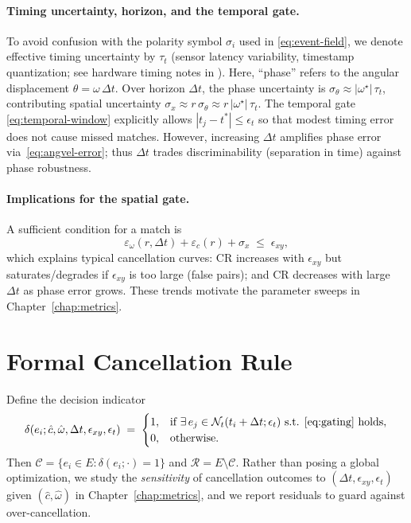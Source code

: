 \paragraph{Timing uncertainty, horizon, and the temporal gate.}
To avoid confusion with the polarity symbol $\sigma_i$ used in \eqref{eq:event-field}, we denote effective timing uncertainty by $\tau_t$ (sensor latency variability, timestamp quantization; see hardware timing notes in \cite{Lichtsteiner2008DVS,Delbruck2014ISCAS}). Here, ``phase'' refers to the angular displacement $\theta=\omega\,\Delta t$. Over horizon $\Delta t$, the phase uncertainty is $\sigma_\theta \approx |\omega^\star|\,\tau_t$, contributing spatial uncertainty $\sigma_x \approx r\,\sigma_\theta \approx r\,|\omega^\star|\,\tau_t$. The temporal gate \eqref{eq:temporal-window} explicitly allows $|t_j-t^*|\le \epsilon_t$ so that modest timing error does not cause missed matches. However, increasing $\Delta t$ amplifies phase error via~\eqref{eq:angvel-error}; thus $\Delta t$ trades discriminability (separation in time) against phase robustness.

\paragraph{Implications for the spatial gate.}
A sufficient condition for a match is
\begin{equation}
\varepsilon_{\omega}(r,\Delta t) + \varepsilon_c(r) + \sigma_x \;\le\; \epsilon_{xy},
\label{eq:gate-condition}
\end{equation}
which explains typical cancellation curves: $\mathrm{CR}$ increases with $\epsilon_{xy}$ but saturates/degrades if $\epsilon_{xy}$ is too large (false pairs); and $\mathrm{CR}$ decreases with large $\Delta t$ as phase error grows. These trends motivate the parameter sweeps in Chapter~\ref{chap:metrics}.

\section{Formal Cancellation Rule}
Define the decision indicator
\begin{equation}
\delta(e_i; \hat c,\hat\omega,\Delta t,\epsilon_{xy},\epsilon_t) \;=\;
\begin{cases}
1, & \text{if } \exists\, e_j \in \mathcal{N}_t(t_i+\Delta t;\epsilon_t) \text{ s.t. } \eqref{eq:gating}\text{ holds},\\
0, & \text{otherwise.}
\end{cases}
\label{eq:delta-indicator}
\end{equation}
Then $\mathcal{C}=\{e_i\in E:\delta(e_i;\cdot)=1\}$ and $\mathcal{R}=E\setminus \mathcal{C}$. Rather than posing a global optimization, we study the \emph{sensitivity} of cancellation outcomes to $(\Delta t,\epsilon_{xy},\epsilon_t)$ given $(\hat c,\hat\omega)$ in Chapter~\ref{chap:metrics}, and we report residuals to guard against over-cancellation.

